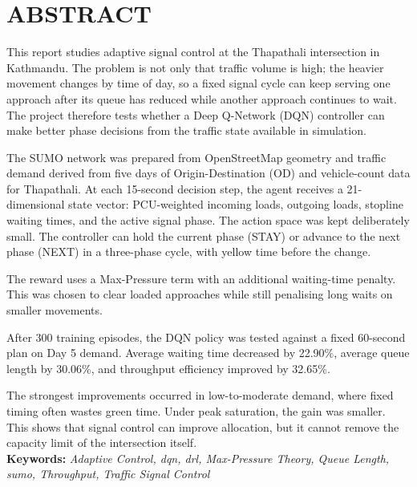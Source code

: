 

\chapter*{ABSTRACT}
{}

This report studies adaptive signal control at the Thapathali
intersection in Kathmandu. The problem is not only that traffic volume is
high; the heavier movement changes by time of day, so a fixed signal
cycle can keep serving one approach after its queue has reduced while
another approach continues to wait. The project therefore tests whether a
Deep Q-Network (DQN) controller can make better phase decisions from the
traffic state available in simulation.

The SUMO network was prepared from OpenStreetMap geometry and traffic
demand derived from five days of Origin-Destination (OD) and
vehicle-count data for Thapathali. At each 15-second decision step, the
agent receives a 21-dimensional state vector: PCU-weighted incoming
loads, outgoing loads, stopline waiting times, and the active signal
phase. The action space was kept deliberately small. The controller can
hold the current phase (STAY) or advance to the next phase (NEXT) in a
three-phase cycle, with yellow time before the change.

The reward uses a Max-Pressure term with an additional waiting-time
penalty. This was chosen to clear loaded approaches while still
penalising long waits on smaller movements.

After 300 training episodes, the DQN policy was tested against a fixed
60-second plan on Day 5 demand. Average waiting time decreased by
22.90\%, average queue length by 30.06\%, and throughput efficiency
improved by 32.65\%.

The strongest improvements occurred in low-to-moderate demand, where
fixed timing often wastes green time. Under peak saturation, the gain was
smaller. This shows that signal control can improve allocation, but it
cannot remove the capacity limit of the intersection itself.
\vspace{2em}\\
\noindent\textbf{Keywords:} \textit{Adaptive Control, \gls{dqn}, \gls{drl}, Max-Pressure Theory, Queue Length, \gls{sumo}, Throughput, Traffic Signal Control}
